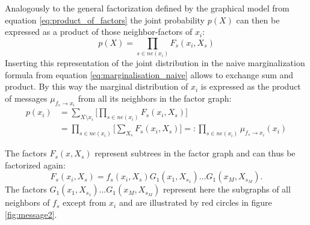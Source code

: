 \documentclass{sigkdd}
\begin{document}
Analogously to the general factorization defined by the graphical model from equation \ref{eq:product_of_factors} the joint probability $p(X)$ can then be expressed as a product of those neighbor-factors of $x_i$:
\begin{equation}\label{eq:product_of_neighbours}
p(X)= \prod_{s \in ne(x_i)} F_s(x_i, X_s)
\end{equation}
Inserting this representation of the joint distribution in the naive marginalization formula from equation \ref{eq:marginalisation_naive} allows to exchange sum and product. By this way the marginal distribution of $x_i$ is expressed as the product of messages $\mu_{f_s \rightarrow x_i}$ from all its neighbors in the factor graph:
\begin{equation}\label{eq:message1}
\begin{split}
p(x_i) &= \sum_{X \setminus x_i} \Big[ \prod_{s \in ne(x_i)} F_s(x_i, X_s) \Big] \\ &= \prod_{s \in ne(x_i)} \Big[ \sum_{X_s} F_s(x_i, X_s)\Big] =: \prod_{s \in ne(x_i)} \mu_{f_s \rightarrow x_i}(x_i)
\end{split}
\end{equation}

The factors $F_s(x,X_s)$ represent subtrees in the factor graph and can thus be factorized again: 
\begin{equation}\label{eq:product2}
F_s(x_i,X_s) = f_s(x_i, X_s) G_1(x_1, X_{s_1})\dots G_1(x_M, X_{s_M}).
\end{equation}
The factors $G_1(x_1, X_{s_1})\dots G_1(x_M, X_{s_M})$ represent here the subgraphs of all neighbors of $f_s$ except from $x_i$ and are illustrated by red circles in figure \ref{fig:message2}.
\end{document}
